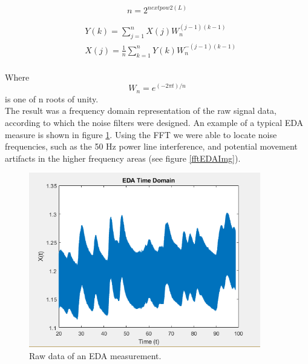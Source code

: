 \begin{equation}
n = 2^{nextpow2(L)}
\end{equation}

\begin{align}\label{fft1}
& Y(k) = \sum\limits_{j=1}^n X(j) W_{n}^{(j-1)(k-1)} \\
& X(j) = \frac{1}{n} \sum\limits_{k=1}^n Y(k) W_{n}^{-(j-1)(k-1)} \\
\end{align} 

Where
\begin{equation}
W_{n} = e^{(-2\pi t)/n}
\end{equation}
is one of n roots of unity.\\

The result was a frequency domain representation of the raw signal data, according to which the noise filters were designed. An example of a typical EDA measure is shown in figure \ref{rawEDAImg}. Using the FFT we were able to locate noise frequencies, such as the 50 Hz power line interference, and potential movement artifacts in the higher frequency areas (see figure \ref{fftEDAImg}).

\begin{figure}[ht]
\centering
\includegraphics[width=0.9\textwidth]{images/rawEDA.png}
\caption{Raw data of an EDA measurement.}
\label{rawEDAImg}
\end{figure}

